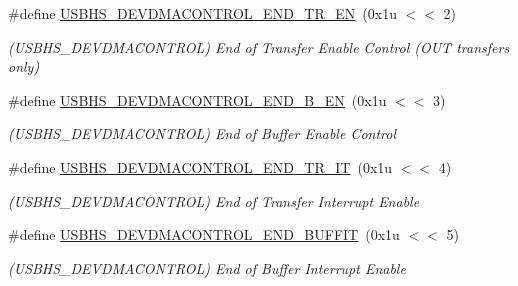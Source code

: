 \begin{DoxyCompactItemize}
\#define \mbox{\hyperlink{group__SAMS70__USBHS_ga4a472d5573d59ca01ab998d35fe42134}{U\+S\+B\+H\+S\+\_\+\+D\+E\+V\+D\+M\+A\+C\+O\+N\+T\+R\+O\+L\+\_\+\+E\+N\+D\+\_\+\+T\+R\+\_\+\+EN}}~(0x1u $<$$<$ 2)
\begin{DoxyCompactList}\small\item\em (U\+S\+B\+H\+S\+\_\+\+D\+E\+V\+D\+M\+A\+C\+O\+N\+T\+R\+OL) End of Transfer Enable Control (O\+UT transfers only) \end{DoxyCompactList}\item 
\mbox{\label{group__SAMS70__USBHS_ga36a6018ba094d2c25e1e5d43fbf81725}} 
\#define \mbox{\hyperlink{group__SAMS70__USBHS_ga36a6018ba094d2c25e1e5d43fbf81725}{U\+S\+B\+H\+S\+\_\+\+D\+E\+V\+D\+M\+A\+C\+O\+N\+T\+R\+O\+L\+\_\+\+E\+N\+D\+\_\+\+B\+\_\+\+EN}}~(0x1u $<$$<$ 3)
\begin{DoxyCompactList}\small\item\em (U\+S\+B\+H\+S\+\_\+\+D\+E\+V\+D\+M\+A\+C\+O\+N\+T\+R\+OL) End of Buffer Enable Control \end{DoxyCompactList}\item 
\mbox{\label{group__SAMS70__USBHS_ga3a52e66b770dc75e0bd3fa0306a56292}} 
\#define \mbox{\hyperlink{group__SAMS70__USBHS_ga3a52e66b770dc75e0bd3fa0306a56292}{U\+S\+B\+H\+S\+\_\+\+D\+E\+V\+D\+M\+A\+C\+O\+N\+T\+R\+O\+L\+\_\+\+E\+N\+D\+\_\+\+T\+R\+\_\+\+IT}}~(0x1u $<$$<$ 4)
\begin{DoxyCompactList}\small\item\em (U\+S\+B\+H\+S\+\_\+\+D\+E\+V\+D\+M\+A\+C\+O\+N\+T\+R\+OL) End of Transfer Interrupt Enable \end{DoxyCompactList}\item 
\mbox{\label{group__SAMS70__USBHS_ga86c6fe730699f43a24dc19e6c7f2ac66}} 
\#define \mbox{\hyperlink{group__SAMS70__USBHS_ga86c6fe730699f43a24dc19e6c7f2ac66}{U\+S\+B\+H\+S\+\_\+\+D\+E\+V\+D\+M\+A\+C\+O\+N\+T\+R\+O\+L\+\_\+\+E\+N\+D\+\_\+\+B\+U\+F\+F\+IT}}~(0x1u $<$$<$ 5)
\begin{DoxyCompactList}\small\item\em (U\+S\+B\+H\+S\+\_\+\+D\+E\+V\+D\+M\+A\+C\+O\+N\+T\+R\+OL) End of Buffer Interrupt Enable \end{DoxyCompactList}\item 
\mbox{\label{group__SAMS70__USBHS_ga86a14d59330c7ea07601a2b61ac6529e}} 

\end{DoxyCompactItemize}

